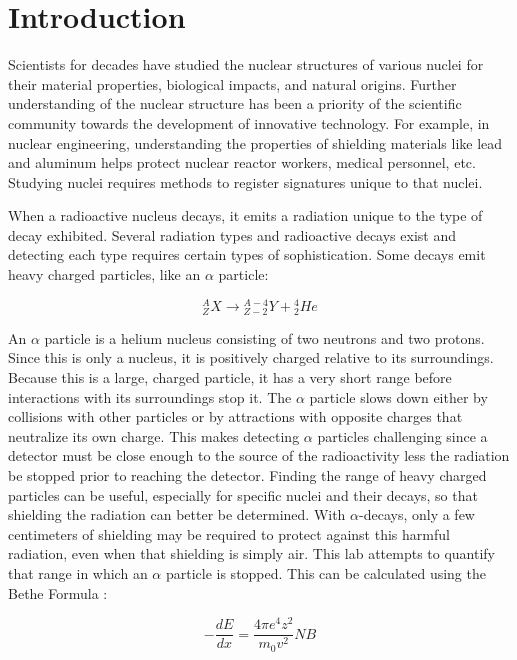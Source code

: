 \section{Introduction}

Scientists for decades have studied the nuclear structures of various nuclei for their material properties, biological impacts, and natural origins. Further understanding of the nuclear structure has been a priority of the scientific community towards the development of innovative technology. For example, in nuclear engineering, understanding the properties of shielding materials like lead and aluminum helps protect nuclear reactor workers, medical personnel, etc. Studying nuclei requires methods to register signatures unique to that nuclei.

When a radioactive nucleus decays, it emits a radiation unique to the type of decay exhibited. Several radiation types and radioactive decays exist and detecting each type requires certain types of sophistication. Some decays emit heavy charged particles, like an $\alpha$ particle:

\begin{equation}
{}^{A}_{Z}X \rightarrow {}^{A-4}_{Z-2}Y + {}^{4}_{2}{He}
\end{equation}

An $\alpha$ particle is a helium nucleus consisting of two neutrons and two protons. Since this is only a nucleus, it is positively charged relative to its surroundings. Because this is a large, charged particle, it has a very short range before interactions with its surroundings stop it. The $\alpha$ particle slows down either by collisions with other particles or by attractions with opposite charges that neutralize its own charge. This makes detecting $\alpha$ particles challenging since a detector must be close enough to the source of the radioactivity less the radiation be stopped prior to reaching the detector. Finding the range of heavy charged particles can be useful, especially for specific nuclei and their decays, so that shielding the radiation can better be determined. With $\alpha$-decays, only a few centimeters of shielding may be required to protect against this harmful radiation, even when that shielding is simply air. This lab attempts to quantify that range in which an $\alpha$ particle is stopped. This can be calculated using the Bethe Formula \cite{melissinos}:

\begin{equation}
-\frac{dE}{dx} = \frac{4\pi e^{4} z^{2}}{m_{0}v^{2}} NB
\end{equation}

